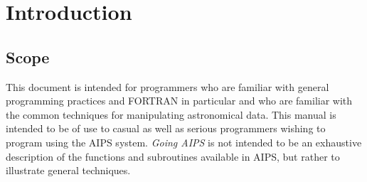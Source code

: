 \chapter{Introduction}
\setcounter{page}{1}

\section{Scope}
This document is intended for programmers who are familiar with
general programming practices and FORTRAN in particular and who are
familiar with the common techniques for manipulating astronomical
data.  This manual is intended to be of use to casual as
well as serious programmers wishing to program using the AIPS system.
{\it Going AIPS}  is not intended to be an exhaustive description of the
functions and subroutines available in AIPS, but rather to illustrate
general techniques.


